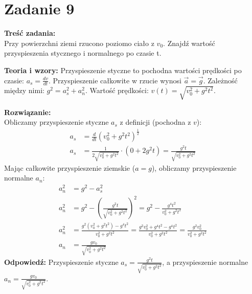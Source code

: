 \documentclass[11pt, a4paper]{article}
\begin{document}
\section*{Zadanie 9}

\textbf{Treść zadania:} \\
Przy powierzchni ziemi rzucono poziomo ciało z $v_0$. Znajdź wartość przyspieszenia stycznego i normalnego po czasie t.

\textbf{Teoria i wzory:}
Przyspieszenie styczne to pochodna wartości prędkości po czasie: $a_s = \frac{dv}{dt}$. Przyspieszenie całkowite w rzucie wynosi $\vec{a} = \vec{g}$. Zależność między nimi: $g^2 = a_s^2 + a_n^2$.
Wartość prędkości: $v(t) = \sqrt{v_0^2 + g^2 t^2}$.

\textbf{Rozwiązanie:} \\
Obliczamy przyspieszenie styczne $a_s$ z definicji (pochodna z $v$):
\begin{align*}
    a_s &= \frac{d}{dt} \left(v_0^2 + g^2 t^2\right)^{\frac{1}{2}} \\
    a_s &= \frac{1}{2\sqrt{v_0^2 + g^2 t^2}} \cdot \left(0 + 2g^2 t\right) = \frac{g^2 t}{\sqrt{v_0^2 + g^2 t^2}}
\end{align*}
Mając całkowite przyspieszenie ziemskie ($a = g$), obliczamy przyspieszenie normalne $a_n$:
\begin{align*}
    a_n^2 &= g^2 - a_s^2 \\
    a_n^2 &= g^2 - \left(\frac{g^2 t}{\sqrt{v_0^2 + g^2 t^2}}\right)^2 = g^2 - \frac{g^4 t^2}{v_0^2 + g^2 t^2} \\
    a_n^2 &= \frac{g^2 (v_0^2 + g^2 t^2) - g^4 t^2}{v_0^2 + g^2 t^2} = \frac{g^2 v_0^2 + g^4 t^2 - g^4 t^2}{v_0^2 + g^2 t^2} = \frac{g^2 v_0^2}{v_0^2 + g^2 t^2} \\
    a_n &= \frac{g v_0}{\sqrt{v_0^2 + g^2 t^2}}
\end{align*}
\textbf{Odpowiedź:} Przyspieszenie styczne $a_s = \frac{g^2 t}{\sqrt{v_0^2 + g^2 t^2}}$, a przyspieszenie normalne $a_n = \frac{g v_0}{\sqrt{v_0^2 + g^2 t^2}}$.
\end{document}

